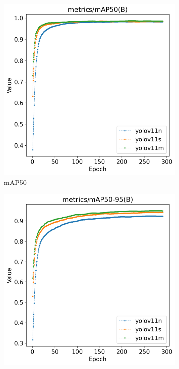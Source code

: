 \begin{figure}[H]
\begin{subfigure}[t]{0.43\textwidth}
        \includegraphics[width=\textwidth]{figs/chap04/track_result/track_metrics_mAP50(B).png}
        \caption{mAP50}
        \label{fig:track_metrics_mAP50}
    \end{subfigure}
    \begin{subfigure}[t]{0.43\textwidth}
        \centering
        \includegraphics[width=\textwidth]{figs/chap04/track_result/track_metrics_mAP50-95(B).png}

\end{subfigure}
\end{figure}

